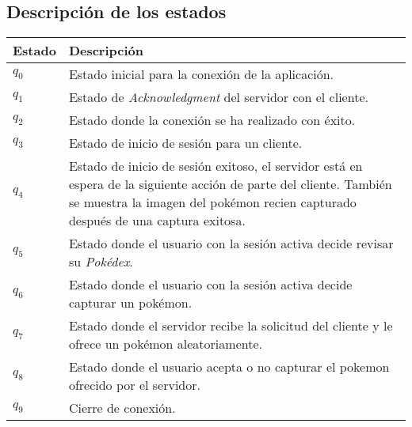 \documentclass[12pt]{article}
\begin{document}
\begin{center}
\\

\subsection{Descripción de los estados}
\begin{tabular}{|l|p{9cm}|}
  \hline
  Estado & Descripción \\
  \hline
  $q_0$ & Estado inicial para la conexión de la aplicación. \\ \hline
  $q_1$ & Estado de \textit{Acknowledgment} del servidor con el cliente. \\ \hline
  $q_2$ & Estado donde la conexión se ha realizado con éxito. \\ \hline
  $q_3$ & Estado de inicio de sesión para un cliente. \\ \hline
  $q_4$ & Estado de inicio de sesión exitoso, el servidor está en espera de la siguiente acción de parte del cliente. También se muestra la imagen del pokémon recien capturado después de una captura exitosa. \\ \hline
  $q_5$ & Estado donde el usuario con la sesión activa decide revisar su \textit{Pokédex}. \\ \hline
  $q_6$ & Estado donde el usuario con la sesión activa decide capturar un pokémon.\\ \hline
  $q_7$ & Estado donde el servidor recibe la solicitud del cliente y le ofrece un pokémon aleatoriamente.\\ \hline
  $q_8$ & Estado donde el usuario acepta o no capturar el pokemon ofrecido por el servidor.\\ \hline
  $q_9$ & Cierre de conexión. \\
  \hline
\end{tabular}
\end{center}
\newpage
\end{document}
